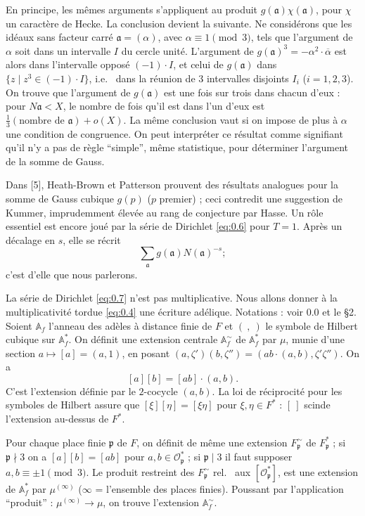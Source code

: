 \documentclass[12pt,a4paper]{article}
\theoremstyle{plain}
\theoremstyle{definition}
\theoremstyle{remark}
\newcommand{\Af}{\mathbb{A}}
\newcommand{\cO}{\mathcal{O}}
\newcommand{\frakp}{\mathfrak{p}}
\newcommand{\fraka}{\mathfrak{a}}
\providecommand{\cO}{\mathcal{O}}
\providecommand{\fraka}{\mathfrak{a}}
\providecommand{\frakp}{\mathfrak{p}}
\begin{document}
En principe, les mêmes arguments s'appliquent au produit $g(\fraka) \chi(\fraka)$, pour $\chi$ un caractère de Hecke. La conclusion devient la suivante. Ne considérons que les idéaux sans facteur carré $\fraka = (\alpha)$, avec $\alpha \equiv 1 \pmod 3$, tels que l'argument de $\alpha$ soit dans un intervalle $I$ du cercle unité. L'argument de $g(\fraka)^3 = -\alpha^2 \cdot \overline{\alpha}$ est alors dans l'intervalle opposé $(-1) \cdot I$, et celui de $g(\fraka)$ dans $\{z \mid z^3 \in (-1) \cdot I\}$, i.e.
\ dans la réunion de $3$ intervalles disjoints $I_i$ ($i = 1, 2, 3$). On trouve que l'argument de $g(\fraka)$ est une fois sur trois dans chacun d'eux : pour $N\fraka < X$, le nombre de fois qu'il est dans l'un d'eux est $\frac{1}{3}(\text{nombre de } \fraka) + o(X)$. La même conclusion vaut si on impose de plus à $\alpha$ une condition de congruence. On peut interpréter ce résultat comme signifiant qu'il n'y a pas de règle ``simple'', même statistique, pour déterminer l'argument de la somme de Gauss.

Dans [5], Heath-Brown et Patterson prouvent des résultats analogues pour la somme de Gauss cubique $g(p)$ ($p$ premier) ; ceci contredit une suggestion de Kummer, imprudemment élevée au rang de conjecture par Hasse. Un rôle essentiel est encore joué par la série de Dirichlet \eqref{eq:0.6} pour $T = 1$. Après un décalage en $s$, elle se récrit
\begin{equation}\label{eq:0.7}
\sum_{\fraka} g(\fraka) N(\fraka)^{-s};
\tag{0.7}
\end{equation}
c'est d'elle que nous parlerons.

La série de Dirichlet \eqref{eq:0.7} n'est pas multiplicative. Nous allons donner à la multiplicativité tordue \eqref{eq:0.4} une écriture adélique. Notations : voir 0.0 et le \S 2. Soient $\Af_f$ l'anneau des adèles à distance finie de $F$ et $(\ ,\ )$ le symbole de Hilbert cubique sur $\Af_f^*$. On définit une extension centrale $\Af_f^\sim$ de $\Af_f^*$ par $\mu$, munie d'une section $a \mapsto [a] = (a, 1)$, en posant $(a, \zeta')(b, \zeta'') = (ab \cdot (a, b), \zeta' \zeta'')$. On a
\begin{equation}\label{eq:0.8}
[a][b] = [ab] \cdot (a, b).
\tag{0.8}
\end{equation}
C'est l'extension définie par le $2$-cocycle $(a, b)$. La loi de réciprocité pour les symboles de Hilbert assure que $[\xi][\eta] = [\xi\eta]$ pour $\xi, \eta \in F^*$ : $[\ ]$ scinde l'extension au-dessus de $F^*$.

Pour chaque place finie $\frakp$ de $F$, on définit de même une extension $F_\frakp^\sim$ de $F_\frakp^*$ ; si $\frakp \nmid 3$ on a $[a][b] = [ab]$ pour $a, b \in \cO_\frakp^*$ ; si $\frakp \mid 3$ il faut supposer $a, b \equiv \pm 1 \pmod 3$. Le produit restreint des $F_\frakp^\sim$ rel.
\ aux $[\cO_\frakp^*]$, est une extension de $\Af_f^*$ par $\mu^{(\infty)}$ ($\infty$ = l'ensemble des places finies). Poussant par l'application ``produit'' : $\mu^{(\infty)} \to \mu$, on trouve l'extension $\Af_f^\sim$.
\end{document}
